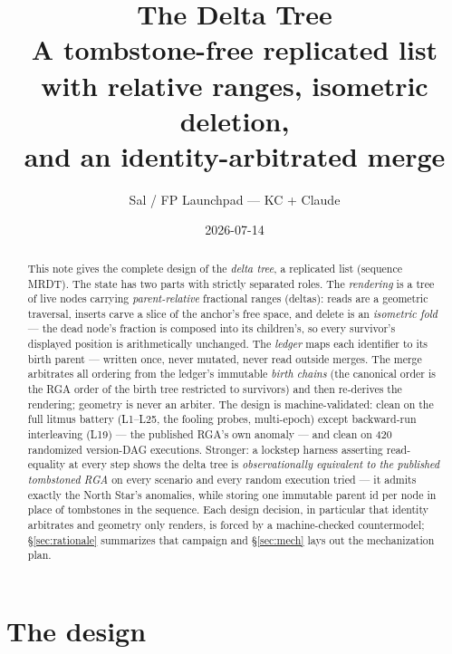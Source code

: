 \documentclass[11pt]{article}
\title{\bfseries The Delta Tree\\[2pt]
\large A tombstone-free replicated list with relative ranges, isometric
deletion,\\ and an identity-arbitrated merge}
\author{Sal / FP Launchpad --- KC + Claude}
\date{2026-07-14}
\begin{document}
\maketitle
\sloppy

\begin{abstract}
\noindent
This note gives the complete design of the \emph{delta tree}, a replicated
list (sequence MRDT). The state has two parts with strictly separated
roles. The \emph{rendering} is a tree of live nodes carrying
\emph{parent-relative} fractional ranges (deltas): reads are a geometric
traversal, inserts carve a slice of the anchor's free space, and delete is
an \emph{isometric fold} --- the dead node's fraction is composed into its
children's, so every survivor's displayed position is arithmetically
unchanged. The \emph{ledger} maps each identifier to its birth parent ---
written once, never mutated, never read outside merges. The merge
arbitrates all ordering from the ledger's immutable \emph{birth chains}
(the canonical order is the RGA order of the birth tree restricted to
survivors) and then re-derives the rendering; geometry is never an
arbiter. The design is machine-validated: clean on the full litmus battery
(L1--L25, the fooling probes, multi-epoch) except backward-run
interleaving (L19) --- the published RGA's own anomaly --- and clean on
420 randomized version-DAG executions. Stronger: a lockstep harness
asserting read-equality at every step shows the delta tree is
\emph{observationally equivalent to the published tombstoned RGA} on every
scenario and every random execution tried --- it admits exactly the North
Star's anomalies, while storing one immutable parent id per node in place
of tombstones in the sequence. Each design decision, in particular that
identity arbitrates and geometry only renders, is forced by a
machine-checked countermodel; \S\ref{sec:rationale} summarizes that
campaign and \S\ref{sec:mech} lays out the mechanization plan.
\end{abstract}

\section{The design}
\label{sec:design}
\end{document}
